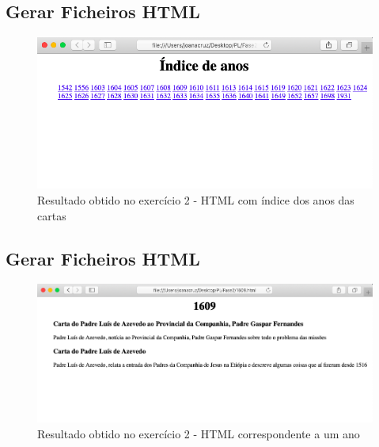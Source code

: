 \documentclass[11pt,a4paper]{report}
\begin{document}
\subsection{Gerar Ficheiros HTML}
\begin{figure}[h]
\includegraphics[scale=0.50]{ex21}
\caption{Resultado obtido no exercício 2 - HTML com índice dos anos das cartas}
\end{figure}

\subsection{Gerar Ficheiros HTML}
\begin{figure}[h]
\includegraphics[width=\textwidth]{ex22}
\caption{Resultado obtido no exercício 2 - HTML correspondente a um ano}
\end{figure}

\newpage
\end{document}
